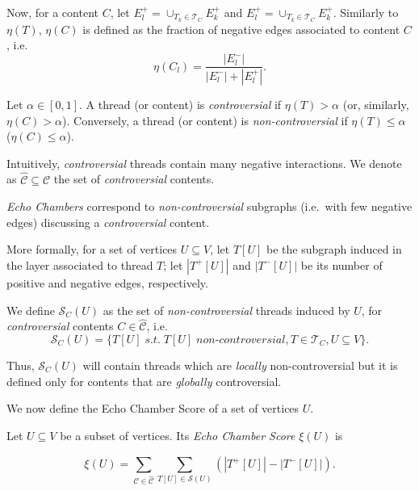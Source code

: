 Now, for a content $C$, let $E^{+}_l = \cup_{T_k \in \mathcal{T} _C} E^+_k$ and $E^{+}_l = \cup_{T_k \in \mathcal{T} _C} E^+_k$.
Similarly to $\eta(T)$, $\eta(C)$ is defined as the fraction of negative edges associated to
content $C$, i.e.
\begin{equation*}
	\eta(C_l) = \frac{|E^{-}_{l}|}{|E^{-}_{l}| + |E^{+}_{l}|}.
\end{equation*}

\begin{definition}
	Let $\alpha \in [0,1]$. A thread (or content) is \emph{controversial} if
	$\eta(T) > \alpha$ (or, similarly, $\eta(C) > \alpha $). Conversely, a
	thread (or content) is \emph{non-controversial} if $\eta(T) \leq \alpha$
	($\eta(C) \leq \alpha$).
\end{definition}

Intuitively, \emph{controversial} threads contain many negative
interactions. We denote as $\hat{\mathcal{C} } \subseteq \mathcal{C} $ the
set of \emph{controversial} contents.

\medskip

\emph{Echo Chambers} correspond to \emph{non-controversial} subgraphs
(i.e.\ with few negative edges) discussing a
\emph{controversial} content.

More formally, for a set of vertices $U \subseteq V$, let $T[U]$ be the subgraph induced in the layer associated to
thread $T$; let $|T^{+} [U]|$ and $|T^{-} [U]|$ be its number
of positive and negative edges, respectively.

We define $\mathcal{S}_C (U)$ as the set of \emph{non-controversial} threads
induced by $U$, for \textit{controversial} contents $C \in \mathcal{\hat{C}}$, i.e.
	{\small
		\begin{equation}
			\mathcal{S}_C (U) = \{ T[U] \; s.t. \; T[U] \; non\text{-}controversial, T \in \mathcal{T} _{C}, U \subseteq V\}.
		\end{equation}
	}

Thus, $\mathcal{S}_C (U)$ will contain threads which are \emph{locally}
non-controversial but it is defined only for contents that are \emph{globally}
controversial.

\medskip

We now define the Echo Chamber Score of a set of vertices $U$.

\begin{definition}
	Let $U \subseteq V$ be a subset of vertices. Its \emph{Echo Chamber Score}
	$\xi(U)$ is

	\begin{equation}
		\label{eq:echo-chamber-score}
		\xi(U) = \sum^{}_{\mathcal{C} \in \mathcal{\hat{C}}} \sum^{}_{T[U] \in
		\mathcal{S} (U)} (|T^{+} [U]| - |T ^{-} [U]|).
	\end{equation}
\end{definition}

